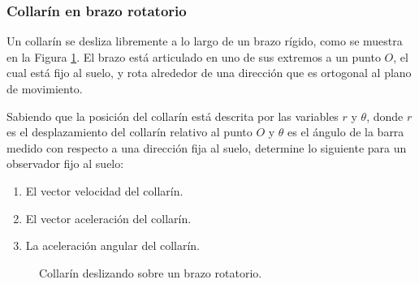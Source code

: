 \subsubsection{Collarín en brazo rotatorio}
Un collarín se desliza libremente a lo largo de un brazo rígido, como se muestra en la Figura \ref{fig:collarin_brazo}. El brazo está articulado en uno de sus extremos a un punto $O$, el cual está fijo al suelo, y rota alrededor de una dirección que es ortogonal al plano de movimiento.

Sabiendo que la posición del collarín está descrita por las variables $r$ y $\theta$, donde $r$ es el desplazamiento del collarín relativo al punto $O$ y $\theta$ es el ángulo de la barra medido con respecto a una dirección fija al suelo, determine lo siguiente para un observador fijo al suelo:

\begin{enumerate}
    \item El vector velocidad del collarín.
    \item El vector aceleración del collarín.
    \item La aceleración angular del collarín.
\end{enumerate}

\begin{figure}[!ht]
    \centering
    \caption{Collarín deslizando sobre un brazo rotatorio.}
    \label{fig:collarin_brazo}
\end{figure}

